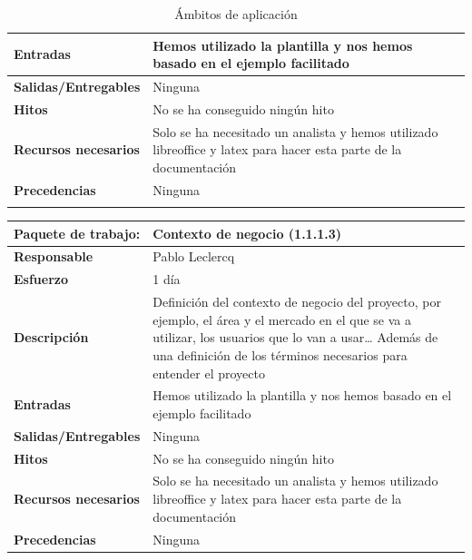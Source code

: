 \documentclass{report}
\begin{document}
\begin{center}
\begin{longtable}{|p{6cm}|p{6cm}|}
                    \hline
                    \textbf{Entradas} & Hemos utilizado la plantilla y nos hemos basado en el ejemplo facilitado\\
                    \hline
                    \textbf{Salidas/Entregables} & Ninguna\\
                    \hline
                    \textbf{Hitos} & No se ha conseguido ningún hito\\
                    \hline
                    \textbf{Recursos necesarios} & Solo se ha necesitado un analista y hemos utilizado libreoffice y latex para hacer esta parte de la documentación\\
                    \hline
                    \textbf{Precedencias} & Ninguna\\
                    \hline
                    \caption{Ámbitos de aplicación}
                \end{longtable}
                \clearpage
                \begin{longtable}{|p{6cm}|p{6cm}|}
                    \hline
                    \textbf{Paquete de trabajo:} & Contexto de negocio (1.1.1.3)\\
                    \hline
                    \textbf{Responsable} & Pablo Leclercq\\
                    \hline
                    \textbf{Esfuerzo} & 1 día\\
                    \hline
                    \textbf{Descripción} & Definición del contexto de negocio del proyecto, por ejemplo, el área y el mercado en el que se va a utilizar, los usuarios que lo van a usar… Además de una definición de los términos necesarios para entender el proyecto \\
                    \hline
                    \textbf{Entradas} & Hemos utilizado la plantilla y nos hemos basado en el ejemplo facilitado\\
                    \hline
                    \textbf{Salidas/Entregables} & Ninguna\\
                    \hline
                    \textbf{Hitos} & No se ha conseguido ningún hito\\
                    \hline
                    \textbf{Recursos necesarios} & Solo se ha necesitado un analista y hemos utilizado libreoffice y latex para hacer esta parte de la documentación\\
                    \hline
                    \textbf{Precedencias} & Ninguna\\

\end{longtable}
\end{center}
\end{document}
